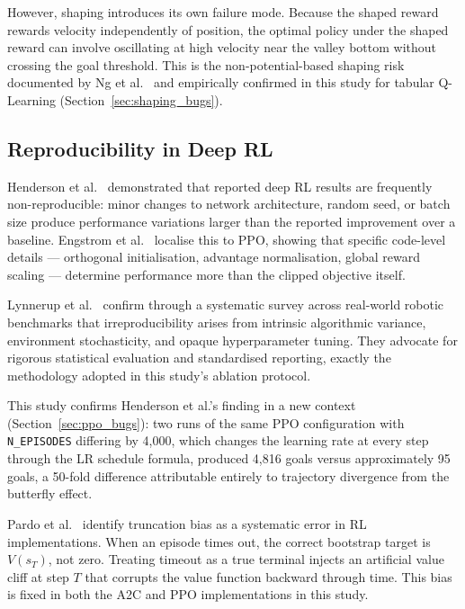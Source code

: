 \documentclass[a4paper,12pt]{article}
\begin{document}
However, shaping introduces its own failure mode. Because the shaped reward rewards velocity independently of position, the optimal policy under the shaped reward can involve oscillating at high velocity near the valley bottom without crossing the goal threshold. This is the non-potential-based shaping risk documented by Ng et al.\ \cite{ng1999policy} and empirically confirmed in this study for tabular Q-Learning (Section~\ref{sec:shaping_bugs}).

\subsection{Reproducibility in Deep RL}

Henderson et al.\ \cite{henderson2018deep} demonstrated that reported deep RL results are frequently non-reproducible: minor changes to network architecture, random seed, or batch size produce performance variations larger than the reported improvement over a baseline. Engstrom et al.\ \cite{engstrom2020implementation} localise this to PPO, showing that specific code-level details --- orthogonal initialisation, advantage normalisation, global reward scaling --- determine performance more than the clipped objective itself.

Lynnerup et al.\ \cite{lynnerup2020survey} confirm through a systematic survey across real-world robotic benchmarks that irreproducibility arises from intrinsic algorithmic variance, environment stochasticity, and opaque hyperparameter tuning. They advocate for rigorous statistical evaluation and standardised reporting, exactly the methodology adopted in this study's ablation protocol.

This study confirms Henderson et al.'s finding in a new context (Section~\ref{sec:ppo_bugs}): two runs of the same PPO configuration with \texttt{N\_EPISODES} differing by 4,000, which changes the learning rate at every step through the LR schedule formula, produced 4,816 goals versus approximately 95 goals, a 50-fold difference attributable entirely to trajectory divergence from the butterfly effect.

Pardo et al.\ \cite{pardo2018time} identify truncation bias as a systematic error in RL implementations. When an episode times out, the correct bootstrap target is $V(s_T)$, not zero. Treating timeout as a true terminal injects an artificial value cliff at step $T$ that corrupts the value function backward through time. This bias is fixed in both the A2C and PPO implementations in this study.
\end{document}
